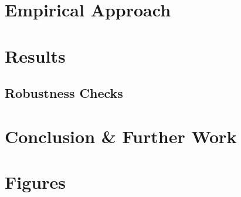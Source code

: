 \documentclass[11pt, oneside]{article}
\begin{document}
	\section{Empirical Approach}
	
	\label{empirical}
	
	\section{Results}
	
	\label{results}
	
	\subsection{Robustness Checks}
	
	\label{robustness}
	
	\section{Conclusion \& Further Work}
	
	\label{conclusion}
	\newpage
	
	
	
	
	\newpage
	\section*{Figures}
	
	
	\newpage
	

	
	
\end{document}
